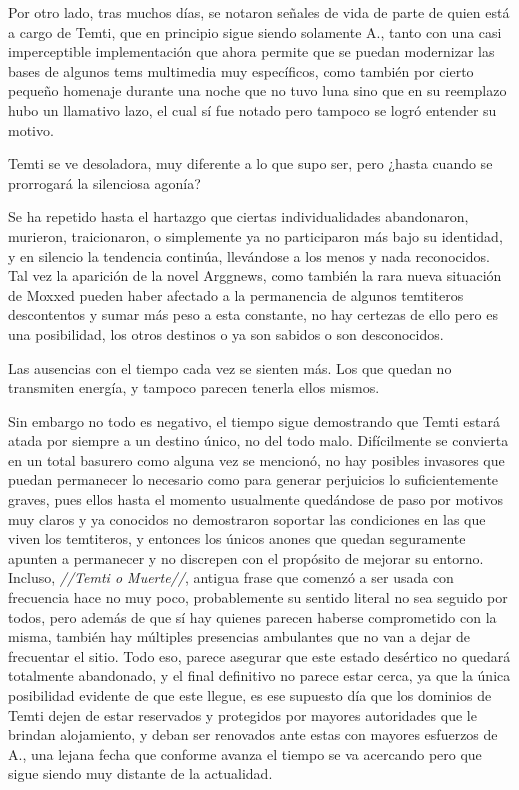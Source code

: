 \documentclass[
  spanish,
]{book}
\begin{document}
Por otro lado, tras muchos días, se notaron señales de vida de parte de quien está a cargo de Temti, que en principio sigue siendo solamente A., tanto con una casi imperceptible implementación que ahora permite que se puedan modernizar las bases de algunos tems multimedia muy específicos, como también por cierto pequeño homenaje durante una noche que no tuvo luna sino que en su reemplazo hubo un llamativo lazo, el cual sí fue notado pero tampoco se logró entender su motivo.

Temti se ve desoladora, muy diferente a lo que supo ser, pero ¿hasta cuando se prorrogará la silenciosa agonía?

Se ha repetido hasta el hartazgo que ciertas individualidades abandonaron, murieron, traicionaron, o simplemente ya no participaron más bajo su identidad, y en silencio la tendencia continúa, llevándose a los menos y nada reconocidos.
Tal vez la aparición de la novel Arggnews, como también la rara nueva situación de Moxxed pueden haber afectado a la permanencia de algunos temtiteros descontentos y sumar más peso a esta constante, no hay certezas de ello pero es una posibilidad, los otros destinos o ya son sabidos o son desconocidos.

Las ausencias con el tiempo cada vez se sienten más. Los que quedan no transmiten energía, y tampoco parecen tenerla ellos mismos.

Sin embargo no todo es negativo, el tiempo sigue demostrando que Temti estará atada por siempre a un destino único, no del todo malo. Difícilmente se convierta en un total basurero como alguna vez se mencionó, no hay posibles invasores que puedan permanecer lo necesario como para generar perjuicios lo suficientemente graves, pues ellos hasta el momento usualmente quedándose de paso por motivos muy claros y ya conocidos no demostraron soportar las condiciones en las que viven los temtiteros, y entonces los únicos anones que quedan seguramente apunten a permanecer y no discrepen con el propósito de mejorar su entorno.
Incluso, \emph{//Temti o Muerte//}, antigua frase que comenzó a ser usada con frecuencia hace no muy poco, probablemente su sentido literal no sea seguido por todos, pero además de que sí hay quienes parecen haberse comprometido con la misma, también hay múltiples presencias ambulantes que no van a dejar de frecuentar el sitio. Todo eso, parece asegurar que este estado desértico no quedará totalmente abandonado, y el final definitivo no parece estar cerca, ya que la única posibilidad evidente de que este llegue, es ese supuesto día que los dominios de Temti dejen de estar reservados y protegidos por mayores autoridades que le brindan alojamiento, y deban ser renovados ante estas con mayores esfuerzos de A., una lejana fecha que conforme avanza el tiempo se va acercando pero que sigue siendo muy distante de la actualidad.
\end{document}
